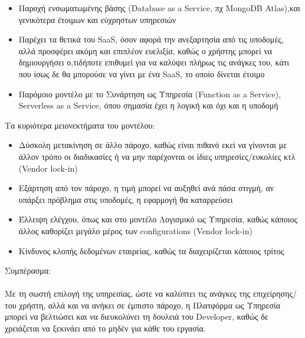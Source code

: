 \documentclass{article}
\begin{document}
\begin{itemize}
\item Παροχή ενσωματωμένης βάσης (Database as a Service, πχ MongoDB Atlas),και γενικότερα έτοιμων και εύχρηστων υπηρεσιών
\item Παρέχει τα θετικά του SaaS, όσον αφορά την ανεξαρτησία από τις υποδομές, αλλά προσφέρει ακόμη και επιπλέον ευελιξία, καθώς ο χρήστης μπορεί να δημιουργήσει ο,τιδήποτε επιθυμεί για να καλύψει πλήρως τις ανάγκες του, κάτι που ίσως δε θα μπορούσε να γίνει με ένα SaaS, το οποίο δίνεται έτοιμο 
\item Παρόμοιο μοντέλο με το Συνάρτηση ως Υπηρεσία (Function as a Service), Serverless as a Service, όπου σημασία έχει η λογική και όχι και η υποδομή
\end{itemize}
Τα κυριότερα μειονεκτήματα του μοντέλου:
\begin{itemize}
\item Δύσκολη μετακίνηση σε άλλο πάροχο, καθώς είναι πιθανό εκεί να γίνονται με άλλον τρόπο οι διαδικασίες ή να μην παρέχονται οι ίδιες υπηρεσίες/ευκολίες κτλ (Vendor lock-in)
\item Εξάρτηση από τον πάροχο, η τιμή μπορεί να αυξηθεί ανά πάσα στιγμή, αν υπάρξει πρόβλημα στις υποδομές, η εφαρμογή θα καταρρεύσει
\item Έλλειψη ελέγχου, όπως και στο μοντέλο Λογισμικό ως Υπηρεσία, καθώς κάποιος άλλος καθορίζει μεγάλο μέρος των configurations (Vendor lock-in)
\item Κίνδυνος κλοπής δεδομένων εταιρείας, καθώς τα διαχειρίζεται κάποιος τρίτος
\end{itemize}
Συμπέρασμα: \\ \\
Με τη σωστή επιλογή της υπηρεσίας, ώστε να καλύπτει τις ανάγκες της επιχείρησης/του χρήστη, αλλά και να ανήκει σε έμπιστο πάροχο, η Πλατφόρμα ως Υπηρεσία μπορεί να βελτιώσει και να διευκολύνει τη δουλειά του Developer, καθώς δε χρειάζεται να ξεκινάει από το μηδέν για κάθε του εργασία.
\end{document}
